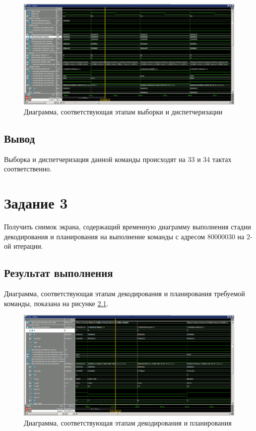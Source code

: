 \begin{figure}[H]
	\begin{center}
		\includegraphics[scale=0.3]{img/8024.png}
	\end{center}
	\captionsetup{justification=centering}
	\caption{Диаграмма, соответствующая этапам выборки и диспетчеризации}
	\label{img:8024}
\end{figure}

\section{Вывод}

Выборка и диспетчеризация данной команды происходят на 33 и 34 тактах соответственно.

\chapter{Задание 3}

Получить снимок экрана, содержащий временную диаграмму выполнения стадии декодирования и планирования на выполнение
команды с адресом 80000030 на 2-ой итерации.

\section{Результат выполнения}

Диаграмма, соответствующая этапам декодирования и
планирования требуемой команды, показана на рисунке \ref{img:8030}.

\begin{figure}[H]
	\begin{center}
		\includegraphics[scale=0.3]{img/8030.png}
	\end{center}
	\captionsetup{justification=centering}
	\caption{Диаграмма, соответствующая этапам декодирования и
планирования}
	\label{img:8030}
\end{figure}

